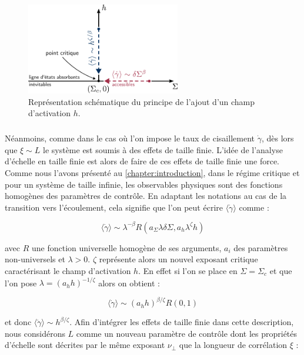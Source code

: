 \begin{figure}
	\centering
	\includegraphics[width=0.6\textwidth]{Chapitre4/Figures/CasPhysique/ApprocheFSS.pdf}
	\caption{Représentation schématique du principe de l'ajout d'un champ d'activation $h$.}
	\label{fig:ChampAct}
\end{figure}

\subparagraph{}Néanmoins, comme dans le cas où l'on impose le taux de cisaillement $\dot{\gamma}$, dès lors que $\xi \sim L$ le système est soumis à des effets de taille finie. L'idée de l'analyse d'échelle en taille finie est alors de faire de ces effets de taille finie une force. Comme nous l'avons présenté au \autoref{chapter:introduction}, dans le régime critique et pour un système de taille infinie, les observables physiques sont des fonctions homogènes des paramètres de contrôle. En adaptant les notations au cas de la transition vers l'écoulement, cela signifie que l'on peut écrire $ \langle \dot{\gamma} \rangle$ comme :

\begin{equation}
\langle\dot{\gamma}\rangle \sim \lambda^{-\beta}R(a_\Sigma\lambda\delta\Sigma, a_h\lambda^\zeta h)
\end{equation}

\noindent avec $R$ une fonction universelle homogène de ses arguments, $a_i$ des paramètres non-universels et $\lambda > 0$. $\zeta$ représente alors un nouvel exposant critique caractérisant le champ d'activation $h$. En effet si l'on se place en $\Sigma = \Sigma_c$ et que l'on pose $\lambda=(a_h h)^{-1/\zeta}$ alors on obtient :

\begin{equation}
    \langle\dot{\gamma}\rangle \sim (a_h h)^{\beta/\zeta}R(0, 1)
\end{equation}

\noindent et donc $\langle\dot{\gamma}\rangle \sim  h^{\beta/\zeta}$. Afin d'intégrer les effets de taille finie dans cette description, nous considérons $L$ comme un nouveau paramètre de contrôle dont les propriétés d'échelle sont décrites par le même exposant $\nu_\perp$ que la longueur de corrélation $\xi$ :

